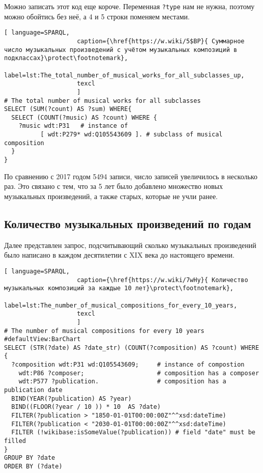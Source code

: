 Можно записать этот код еще короче. Переменная \lstinline|?type| нам не нужна, поэтому можно обойтись без неё, а 4 и 5 строки поменяем местами.

\begin{lstlisting}[ language=SPARQL,
                    caption={\href{https://w.wiki/5$BP}{ Суммарное число музыкальных произведений с учётом музыкальных композиций в подклассах}\protect\footnotemark},
                    label=lst:The_total_number_of_musical_works_for_all_subclasses_up,
                    texcl 
                    ]
# The total number of musical works for all subclasses 
SELECT (SUM(?count) AS ?sum) WHERE{
  SELECT (COUNT(?music) AS ?count) WHERE {
    ?music wdt:P31   # instance of
          [ wdt:P279* wd:Q105543609 ]. # subclass of musical composition
  }
}
\end{lstlisting}%

По сравнению с 2017 годом \num{5494} записи, число записей увеличилось в несколько раз. Это связано с тем, что за 5 лет было добавлено множество новых музыкальных произведений, а также старых, которые не учли ранее.


\subsection{Количество музыкальных произведений по годам}
Далее представлен запрос, подсчитывающий сколько музыкальных произведений было написано в каждом десятилетии с XIX века до настоящего времени.

\begin{lstlisting}[ language=SPARQL,
                    caption={\href{https://w.wiki/7wHy}{ Количество музыкальных композиций за каждые 10 лет}\protect\footnotemark},
                    label=lst:The_number_of_musical_compositions_for_every_10_years,
                    texcl 
                    ]
# The number of musical compositions for every 10 years
#defaultView:BarChart
SELECT (STR(?date) AS ?date_str) (COUNT(?composition) AS ?count) WHERE {
  ?composition wdt:P31 wd:Q105543609;     # instance of compostion
    wdt:P86 ?composer;                    # composition has a composer
    wdt:P577 ?publication.                # composition has a publication date
  BIND(YEAR(?publication) AS ?year)
  BIND((FLOOR(?year / 10 )) * 10  AS ?date)
  FILTER(?publication > "1850-01-01T00:00:00Z"^^xsd:dateTime)
  FILTER(?publication < "2030-01-01T00:00:00Z"^^xsd:dateTime) 
  FILTER (!wikibase:isSomeValue(?publication)) # field "date" must be filled
}
GROUP BY ?date
ORDER BY (?date)
\end{lstlisting}%

